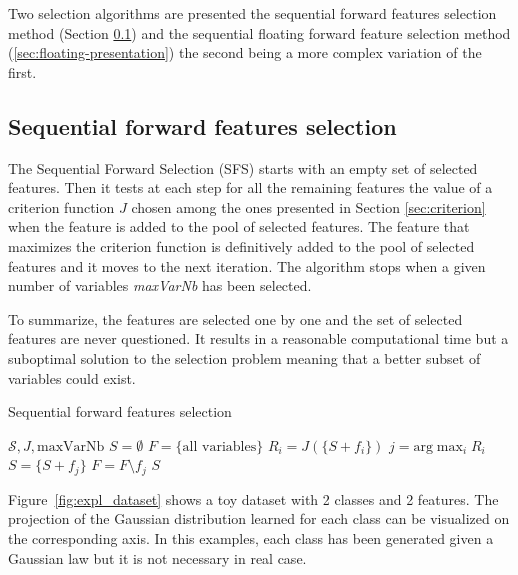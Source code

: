 \documentclass[a4paper,11pt,DIV=16,abstracton]{scrartcl}
\begin{document}
Two selection algorithms are presented the sequential forward features selection method (Section \ref{sec:forward-presentation}) and the sequential floating forward feature selection method (\ref{sec:floating-presentation}) the second being a more complex variation of the first.

    \subsection{Sequential forward features selection}
    \label{sec:forward-presentation}

    The Sequential Forward Selection (SFS) starts with an empty set of selected features. Then it tests at each step for all the remaining features the value of a criterion function $J$ chosen among the ones presented in Section \ref{sec:criterion} when the feature is added to the pool of selected features. The feature that maximizes the criterion function is definitively added to the pool of selected features and it moves to the next iteration. The algorithm stops when a given number of variables \emph{maxVarNb} has been selected.

    To summarize, the features are selected one by one and the set of selected features are never questioned. It results in a reasonable computational time but a suboptimal solution to the selection problem meaning that a better subset of variables could exist.

    \begin{algorithm}
    \caption{Sequential forward features selection\label{alg:sfs}}
    {\fontsize{10}{10}\selectfont
    \begin{algorithmic}[1]
    \REQUIRE $\mathcal{S},J,\text{maxVarNb}$
    \STATE $S=\emptyset$
    \STATE $F=\text{\{all variables\}}$
    \STATE $R_i = J(\{S + f_i\})$
    \ENDFOR
    \STATE $j=\text{arg} \max_{i} R_i$
    \STATE $S = \{S + f_j\}$
    \STATE $F = F \setminus f_j$
    \ENDWHILE
    \RETURN $S$
    \end{algorithmic}
    }
    \end{algorithm}


    Figure~\ref{fig:expl_dataset} shows a toy dataset with 2 classes and 2 features. The projection of the Gaussian distribution learned for each class can be visualized on the corresponding axis. In this examples, each class has been generated given a Gaussian law but it is not necessary in real case.
\end{document}
